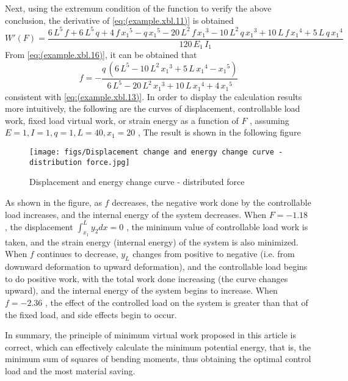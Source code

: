 Next, using the extremum condition of the function to verify the above conclusion, the derivative of \ref{eq:(example.xbl.11)} is obtained
\begin{equation}\label{eq:(example.xbl.15)}
W'(F)=\frac{6\, L^5 \,f+6\,L^5 \,q+4\,f\, {x_1 }^5 -q\,{x_1 }^5 -20\,L^2 \,f\,{x_1 }^3 -10\,L^2 \,q\,{x_1 }^3 +10\,L\,f\,{x_1 }^4 +5\,L\,q\,{x_1 }^4 }{120\,E_1 \,I_1 }
\end{equation}
From \ref{eq:(example.xbl.16)}, it can be obtained that
\begin{equation}\label{eq:(example.xbl.17)}
f=-\frac{q\,{\left(6\,L^5 -10\,L^2 \,{x_1 }^3 +5\,L\,{x_1 }^4 -{x_1 }^5 \right)}}{6\,L^5 -20\,L^2 \,{x_1 }^3 +10\,L\,{x_1 }^4 +4\,{x_1 }^5 }
\end{equation}
consistent with \ref{eq:(example.xbl.13)}.
In order to display the calculation results more intuitively, the following are the curves of displacement, controllable load work, fixed load virtual work, or strain energy as a function of $ F $ , assuming $ E=1, I=1,q=1,L=40,x_1=20$ , The result is shown in the following figure
\begin{figure}[h!] %
    \centering
    \texttt{[image: figs/Displacement change and energy change curve - distribution force.jpg]} 
    \caption{Displacement and energy change curve - distributed force}
    \label{fig:jizhongli}
\end{figure}

As shown in the figure, as $ f$  decreases, the negative work done by the controllable load increases, and the internal energy of the system decreases. When $ F=-1.18$ , the displacement $ \int_ {x_1}^ {L}y_2 dx=0 $ , the minimum value of controllable load work is taken, and the strain energy (internal energy) of the system is also minimized. When $ f$  continues to decrease, $ y_L $  changes from positive to negative (i.e. from downward deformation to upward deformation), and the controllable load begins to do positive work, with the total work done increasing (the curve changes upward), and the internal energy of the system begins to increase. When $ f=-2.36 $ , the effect of the controlled load on the system is greater than that of the fixed load, and side effects begin to occur.

In summary, the principle of minimum virtual work proposed in this article is correct, which can effectively calculate the minimum potential energy, that is, the minimum sum of squares of bending moments, thus obtaining the optimal control load and the most material saving.

